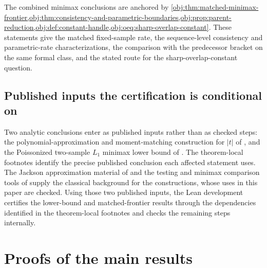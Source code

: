 \documentclass[11pt]{article}
\begin{document}
The combined minimax conclusions are anchored by \cref{obj:thm:matched-minimax-frontier,obj:thm:consistency-and-parametric-boundaries,obj:prop:parent-reduction,obj:def:constant-handle,obj:oeq:sharp-overlap-constant}. These statements give the matched fixed-sample rate, the sequence-level consistency and parametric-rate characterizations, the comparison with the predecessor bracket on the same formal class, and the stated route for the sharp-overlap-constant question.

\subsection*{Published inputs the certification is conditional on}

Two analytic conclusions enter as published inputs rather than as checked steps: the polynomial-approximation and moment-matching construction for \(|t|\) of \citet[Lemma 1 and Section 3.1]{CaiLow2011L1}, and the Poissonized two-sample \(L_1\) minimax lower bound of \citet[Theorem 3, equation (24)]{JiaoHanWeissman2018L1}. The theorem-local footnotes identify the precise published conclusion each affected statement uses. The Jackson approximation material of \citet{DeVore1993} and the testing and minimax comparison tools of \citet{LeCam1986,Tsybakov2009} supply the classical background for the constructions, whose uses in this paper are checked. Using those two published inputs, the Lean development certifies the lower-bound and matched-frontier results through the dependencies identified in the theorem-local footnotes and checks the remaining steps internally.


\section{Proofs of the main results}\label{sec:deferred-proofs}
\end{document}
